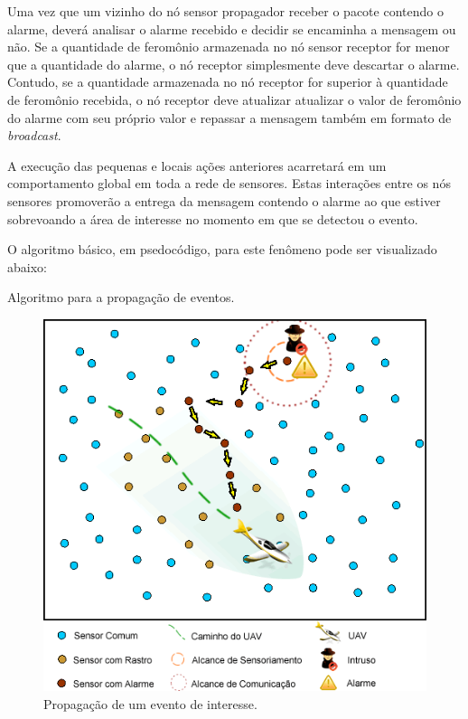 Uma vez que um vizinho do nó sensor propagador receber o pacote contendo o alarme, deverá analisar o alarme recebido e decidir se encaminha a mensagem ou não.  Se a quantidade de feromônio armazenada no nó sensor receptor for menor que a quantidade do alarme, o nó receptor simplesmente deve descartar o alarme. Contudo, se a quantidade armazenada no nó receptor for superior à quantidade de feromônio recebida, o nó receptor deve atualizar atualizar o valor de feromônio do alarme com seu próprio valor e repassar a mensagem também em formato de \emph{broadcast}. 

A execução das pequenas e locais ações anteriores acarretará em um comportamento global em toda a rede de sensores. Estas interações entre os nós sensores promoverão a entrega da mensagem contendo o alarme ao \vant que estiver sobrevoando a área de interesse no momento em que se detectou o evento.

O algoritmo básico, em psedocódigo, para este fenômeno pode ser visualizado abaixo: \\


\begin{algorithm}[H]
	


	
\caption{Algoritmo para a propagação de eventos.}
\end{algorithm}


\begin{figure}[h!]
\centering
\includegraphics[width=12cm]{pictures/application.png}
\caption{Propagação de um evento de interesse.}
 \label{fig:app}
\end{figure}

